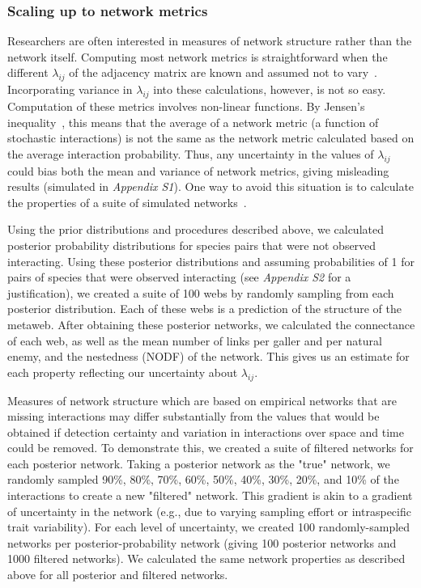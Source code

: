\documentclass[12pt]{article}
\begin{document}
\begin{spacing}{2.0}
    \subsubsection*{Scaling up to network metrics}

      Researchers are often interested in measures of network structure rather than the network itself. Computing most network metrics is straightforward when the different $\lambda_{ij}$ of the adjacency matrix are known and assumed not to vary~\citep{Poisot2016}. Incorporating variance in $\lambda_{ij}$ into these calculations, however, is not so easy. Computation of these metrics involves non-linear functions. By Jensen's inequality~\citep{Jensen1906}, this means that the average of a network metric (a function of stochastic interactions) is not the same as the network metric calculated based on the average interaction probability. Thus, any uncertainty in the values of $\lambda_{ij}$ could bias both the mean and variance of network metrics, giving misleading results (simulated in \emph{Appendix S1}). One way to avoid this situation is to calculate the properties of a suite of simulated networks~\citep{Vazquez2005,Guimera2009}.


      Using the prior distributions and procedures described above, we calculated posterior probability distributions for species pairs that were not observed interacting. Using these posterior distributions and assuming probabilities of 1 for pairs of species that were observed interacting (see \emph{Appendix S2} for a justification), we created a suite of 100 webs by randomly sampling from each posterior distribution. Each of these webs is a prediction of the structure of the metaweb. After obtaining these posterior networks, we calculated the connectance of each web, as well as the mean number of links per galler and per natural enemy, and the nestedness (NODF) of the network. This gives us an estimate for each property reflecting our uncertainty about $\lambda_{ij}$.


      Measures of network structure which are based on empirical networks that are missing interactions may differ substantially from the values that would be obtained if detection certainty and variation in interactions over space and time could be removed. To demonstrate this, we created a suite of filtered networks for each posterior network. Taking a posterior network as the "true" network, we randomly sampled 90\%, 80\%, 70\%, 60\%, 50\%, 40\%, 30\%, 20\%, and 10\% of the interactions to create a new "filtered" network. This gradient is akin to a gradient of uncertainty in the network (e.g., due to varying sampling effort or intraspecific trait variability). For each level of uncertainty, we created 100 randomly-sampled networks per posterior-probability network (giving 100 posterior networks and 1000 filtered networks). We calculated the same network properties as described above for all posterior and filtered networks.



\end{spacing}
\end{document}
